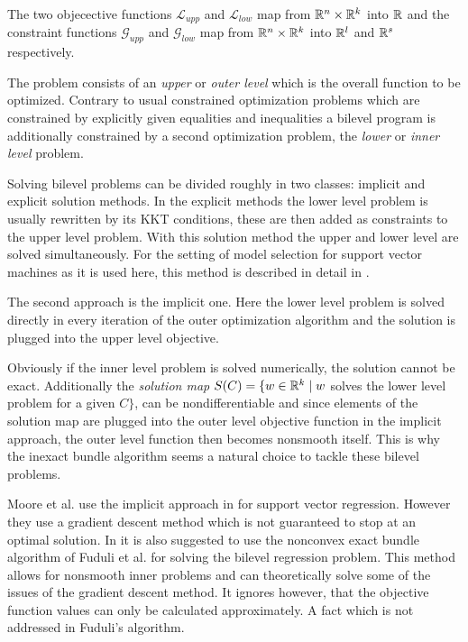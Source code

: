 The two objecective functions \(\mathcal{L}_{upp}\) and \(\mathcal{L}_{low}\) map from \(\mathbb{R}^n\times\mathbb{R}^k\) into \(\mathbb{R}\) and the constraint functions \(\mathcal{G}_{upp}\) and \(\mathcal{G}_{low}\) map from \(\mathbb{R}^n\times\mathbb{R}^k\) into \(\mathbb{R}^l\) and \(\mathbb{R}^s\) respectively. 

The problem consists of an \emph{upper} or \emph{outer level} which is the overall function to be optimized. Contrary to usual constrained optimization problems which are constrained by explicitly given equalities and inequalities a  bilevel program is additionally constrained by a second optimization problem, the \emph{lower} or \emph{inner level} problem.

Solving bilevel problems can be divided roughly in two classes: implicit and explicit solution methods. 
In the explicit methods the lower level problem is usually rewritten by its KKT conditions, these are then added as constraints to the upper level problem. With this solution method the upper and lower level are solved simultaneously. For the setting of model selection for support vector machines as it is used here, this method is described in detail in \cite{Kunapuli2008}.

The second approach is the implicit one. Here the lower level problem is solved directly in every iteration of the outer optimization algorithm and the solution is plugged into the upper level objective. 

Obviously if the inner level problem is solved numerically, the solution cannot be exact. Additionally the \emph{solution map} \( S(C) = \{w\in \mathbb{R}^k \mid w\) solves the lower level problem for a given \(C\}\), can be nondifferentiable \cite{Outrata1998} and since elements of  the solution map are plugged into the outer level objective function in the implicit approach, the outer level function then becomes nonsmooth itself. This is why the inexact bundle algorithm seems a natural choice to tackle these bilevel problems. 

Moore et al. use the implicit approach in \cite{Moore2011} for support vector regression. However they use a gradient descent method which is not guaranteed to stop at an optimal solution.
In \cite{Moore2010a} it is also suggested to use the nonconvex exact bundle algorithm of Fuduli et al. \cite{Fuduli2004a} for solving the bilevel regression problem. This method allows for nonsmooth inner problems and can theoretically solve some of the issues of the gradient descent method. It ignores however, that the objective function values can only be calculated approximately. A fact which is not addressed in Fuduli's algorithm.

